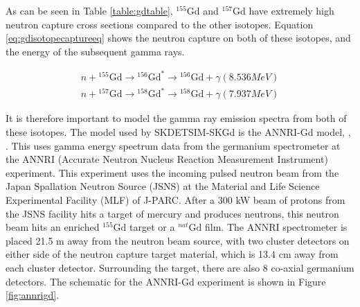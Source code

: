 As can be seen in Table \ref{table:gdtable}, ${ }^{155} \mathrm{Gd}$ and ${ }^{157} \mathrm{Gd}$ have extremely high neutron capture cross sections compared to the other isotopes. Equation \ref{eq:gdisotopecaptureeq} shows the neutron capture on both of these isotopes, and the energy of the subsequent gamma rays.

\begin{equation}
\begin{split}
 {n}+{ }^{155} \mathrm{Gd} \rightarrow{ }^{156} \mathrm{Gd}^{*} \rightarrow{ }^{156} \mathrm{Gd}+\gamma  (8.536 MeV)\\
 {n}+{ }^{157} \mathrm{Gd} \rightarrow{ }^{158} \mathrm{Gd}^{*} \rightarrow{ }^{158} \mathrm{Gd}+\gamma  (7.937 MeV)
\end{split}
\label{eq:gdisotopecaptureeq}    
\end{equation}




It is therefore important to model the gamma ray emission spectra from both of these isotopes. The model used by SKDETSIM-SKGd is the ANNRI-Gd model, \cite{annri_gd_energy}, \cite{tanaka_gamma_2020}. This uses gamma energy spectrum data from the germanium spectrometer at the ANNRI (Accurate Neutron Nucleus Reaction Measurement Instrument) experiment. This experiment uses the incoming pulsed neutron beam from the Japan Spallation Neutron Source (JSNS) at the Material and Life Science Experimental Facility (MLF) of J-PARC. After a 300 kW beam of protons from the JSNS facility hits a target of mercury and produces neutrons, this neutron beam hits an enriched ${ }^{155} \mathrm{Gd}$ target or a ${ }^{nat} \mathrm{Gd}$ film. The ANNRI spectrometer is placed 21.5 m away from the neutron beam source, with two cluster detectors on either side of the neutron capture target material, which is 13.4 cm away from each cluster detector. Surrounding the target, there are also 8 co-axial germanium detectors. The schematic for the ANNRI-Gd experiment is shown in Figure \ref{fig:annrigd}.

